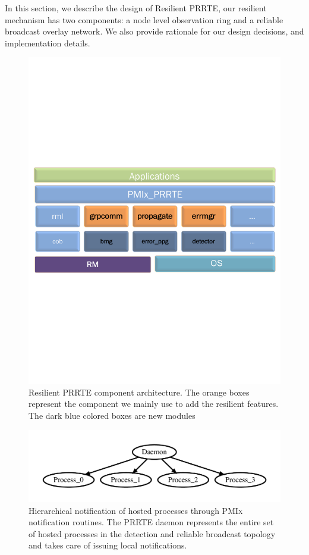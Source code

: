 \documentclass[sigconf]{acmart}
\newcommand{\prrte}[0]{\textsc{PRRTE}\xspace}
\newcommand{\pmix}[0]{\textsc{PMIx}\xspace}
\begin{document}
In this section, we describe the design of Resilient \prrte, our resilient mechanism has two components: a node level observation ring and a reliable broadcast overlay network. We also provide rationale for our design decisions, and implementation details.

\begin{figure}[h]
  \centering
  \includegraphics[trim=0.2cm 9.0cm 0.2cm 9cm,width=\linewidth]{PMIx_PRRTE.pdf}
  \caption{Resilient \prrte component architecture. The orange boxes represent the component we mainly use to add the resilient features. The dark blue colored boxes are new modules}\label{fig:prrte}
\end{figure}

\begin{figure}[h]
  \centering
  \includegraphics[width=\linewidth]{server_client.pdf}
  \caption{Hierarchical notification of hosted processes through \pmix notification routines. The \prrte daemon represents the entire set of hosted processes in the detection and reliable broadcast topology and takes care of issuing local notifications.}\label{fig:hosted}
\end{figure}
\end{document}
